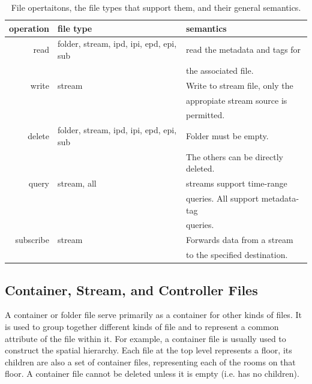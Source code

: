 \begin{table}[h]
\begin{center}
\begin{tabular}{| r | l | l |}
	\hline
	\textbf{operation} & \textbf{file type} & \textbf{semantics} \\ \hline
	read & folder, stream, ipd, ipi, epd, epi, sub & read the metadata and tags for \\
		 &										   & the associated file. \\ \hline
	write &  stream & Write to stream file, only the \\ 
		  & 		& appropiate stream source is \\
		  &			& permitted.\\ \hline
	delete & folder, stream, ipd, ipi, epd, epi, sub & Folder must be empty.  \\
		   & 										 & The others can be directly deleted. \\ \hline
	query &  stream, all & streams support time-range   \\
		  &			     & queries. All support metadata-tag \\ 
		  &				 & queries. \\ \hline
	subscribe & stream & Forwards data from a stream \\
			  &		   & to the specified destination.\\
	\hline
\end{tabular}
\caption{File opertaitons, the file types that support them, and their general semantics.}
\label{tab:semantics}
\end{center}
\end{table}

\subsection{Container, Stream, and Controller Files}
A container or folder file serve primarily as a container for other kinds of files.  It is used to group together different kinds of file and
to represent a common attribute of the file within it.  For example, a container file is usually used to construct the spatial hierarchy.
Each file at the top level represents a floor, its children are also a set of container files, representing each of the rooms on that floor.
A container file cannot be deleted unless it is empty (i.e. has no children).

